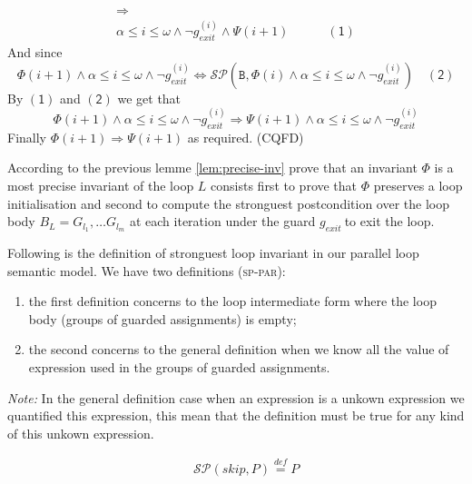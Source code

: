 \documentclass[a4paper,10pt]{article}
\newcommand{\idx}{\ensuremath{i}\xspace}
\newcommand{\idxinitial}{\ensuremath{\alpha}\xspace}
\newcommand{\idxfinal}{\ensuremath{\omega}\xspace}
\newcommand{\gexit}{\ensuremath{\mathit{g_{exit}~}}}
\newcommand{\at}[1]{{(#1)}}
\newcommand{\patternnote}{\noindent\textit{Note:}\xspace}
\newcommand{\symdef}{\ensuremath{\overset{\mathit{def}}{=}}}
\newcommand{\sppar}{\textsc{sp-par}\xspace}
\newcounter{proofnum} %
\newcounter{pc} %
\newenvironment{proof}[1][Proof.]{\refstepcounter{proofnum}\begin{trivlist}
\item[\hskip \labelsep {\bfseries #1}]}{\end{trivlist}}
\newcommand{\spostsym}{\ensuremath{\mathcal{SP}}\xspace}
\newcommand{\spost}[2]{\ensuremath{\spostsym(#1,#2)}}
\begin{document}
\begin{proof}
\begin{align*}
    &\Rightarrow&\\
    &\idxinitial \leq i \leq \idxfinal \land \neg g_{exit}^\at{\idx} \land \Psi(i+1) \quad \quad \quad \mathsf{(1)}&
  \end{align*}
  And since $$\Phi(\idx+1) \wedge \idxinitial \leq \idx \leq \idxfinal \land \neg g_{exit}^\at{\idx} \Leftrightarrow
  \spost{\texttt{B}}{\Phi(\idx) \land \idxinitial \leq \idx \leq \idxfinal \land \neg g_{exit}^\at{\idx}} \quad \mathsf{(2)}$$
  By $\mathsf{(1)}$ and $\mathsf{(2)}$  we get that
  $$\Phi(\idx+1) \wedge \idxinitial \leq \idx \leq \idxfinal \land \neg g_{exit}^\at{\idx} \Rightarrow 
  \Psi(i+1) \land \idxinitial \leq i \leq \idxfinal \land \neg g_{exit}^\at{\idx}$$
  Finally $\Phi(\idx+1) \Rightarrow \Psi(i+1)$ as required. (CQFD)
\end{proof}


According to the previous lemme \ref{lem:precise-inv} prove that an invariant $\Phi$ 
is a most precise invariant of the loop $L$ consists first to prove that $\Phi$ preserves 
a loop initialisation and second to compute the stronguest postcondition over the loop body 
$B_L = G_{l_1}, \ldots G_{l_m}$ at each iteration under the guard \gexit to exit the loop.

\vspace{0.5 cm}
Following is the definition of stronguest loop invariant in our parallel loop semantic model.
We have two definitions (\sppar): 
\begin{enumerate}
 \item the first definition concerns to the loop intermediate form 
where the loop body (groups of guarded assignments) is empty;
 \item the second concerns to the general definition when we know 
all the value of expression used in the groups of guarded assignments. 
\end{enumerate}

\patternnote
In the general definition case when an expression is a unkown expression we quantified 
this expression, this mean that the definition must be true for any kind of this unkown expression.

\begin{eqnarray*}
    && \spost{skip}{P} \symdef P  
\end{eqnarray*}
\end{document}
